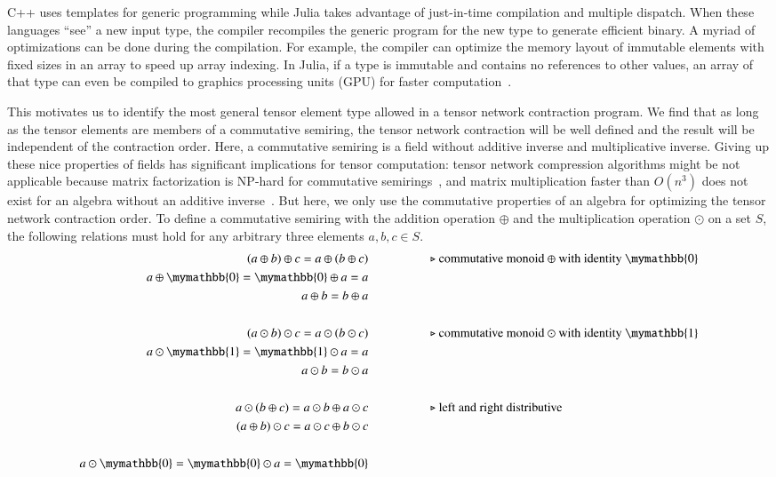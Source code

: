 \documentclass[onefignum, onetabnum]{siamart190516}
\newcommand{\<}{\langle}
\renewcommand{\>}{\rangle}
\newcounter{example}
\begin{document}
C++ uses templates for generic programming while Julia takes advantage of just-in-time compilation and multiple dispatch.
When these languages ``see'' a new input type, the compiler recompiles the generic program for the new type to generate efficient binary.
A myriad of optimizations can be done during the compilation. For example, the compiler can optimize the memory layout of immutable elements with fixed sizes in an array to speed up array indexing.
In Julia, if a type is immutable and contains no references to other values, an array of that type can even be compiled to graphics processing units (GPU) for faster computation~\cite{Besard2018}.

This motivates us to identify the most general tensor element type allowed in a tensor network contraction program.
We find that as long as the tensor elements are members of a commutative semiring, the tensor network contraction will be well defined and the result will be independent of the contraction order.
Here, a commutative semiring is a field without additive inverse and multiplicative inverse.
Giving up these nice properties of  fields has significant implications for tensor computation: tensor network compression algorithms might be not applicable because matrix factorization is NP-hard for commutative semirings~\cite{Shitov2014}, and matrix multiplication faster than $O(n^3)$ does not exist for an algebra without an additive inverse~\cite{Kerr1970}.
But here, we only use the commutative properties of an algebra for optimizing the tensor network contraction order.
To define a commutative semiring with the addition operation $\oplus$ and the multiplication operation $\odot$ on a set $S$, the following relations must hold for any arbitrary three elements $a, b, c \in S$.
\begin{align*}
(a \oplus b) \oplus c = a \oplus (b \oplus c) & \hspace{5em}\text{$\triangleright$ commutative monoid $\oplus$ with identity $\mymathbb{0}$}\\
a \oplus \mymathbb{0} = \mymathbb{0} \oplus a = a &\\
a \oplus b = b \oplus a &\\
&\\
(a \odot b) \odot c = a \odot (b \odot c)  &   \hspace{5em}\text{$\triangleright$ commutative monoid $\odot$ with identity $\mymathbb{1}$}\\
a \odot  \mymathbb{1} =  \mymathbb{1} \odot a = a &\\
a \odot b = b \odot a &\\
&\\
a \odot (b\oplus c) = a\odot b \oplus a\odot c  &  \hspace{5em}\text{$\triangleright$ left and right distributive}\\
(a\oplus b) \odot c = a\odot c \oplus b\odot c &\\
&\\
a \odot \mymathbb{0} = \mymathbb{0} \odot a = \mymathbb{0}
\end{align*}
\end{document}
